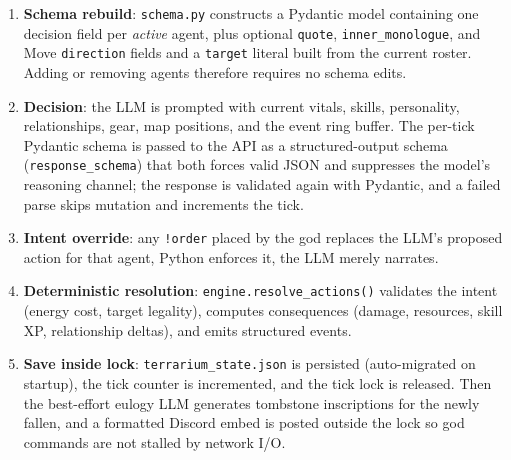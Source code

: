 \documentclass[10pt,a4paper]{article}
\begin{document}
\begin{enumerate}
\item \textbf{Schema rebuild}: \texttt{schema.py} constructs a Pydantic model containing one decision field per \emph{active} agent, plus optional \texttt{quote}, \texttt{inner\_monologue}, and Move \texttt{direction} fields and a \texttt{target} literal built from the current roster. Adding or removing agents therefore requires no schema edits.
\item \textbf{Decision}: the LLM is prompted with current vitals, skills, personality, relationships, gear, map positions, and the event ring buffer. The per-tick Pydantic schema is passed to the API as a structured-output schema (\texttt{response\_schema}) that both forces valid JSON and suppresses the model's reasoning channel; the response is validated again with Pydantic, and a failed parse skips mutation and increments the tick.
\item \textbf{Intent override}: any \texttt{!order} placed by the god replaces the LLM's proposed action for that agent, Python enforces it, the LLM merely narrates.
\item \textbf{Deterministic resolution}: \texttt{engine.resolve\_actions()} validates the intent (energy cost, target legality), computes consequences (damage, resources, skill XP, relationship deltas), and emits structured events.
\item \textbf{Save inside lock}: \texttt{terrarium\_state.json} is persisted (auto-migrated on startup), the tick counter is incremented, and the tick lock is released. Then the best-effort eulogy LLM generates tombstone inscriptions for the newly fallen, and a formatted Discord embed is posted outside the lock so god commands are not stalled by network I/O.
\end{enumerate}
\end{document}
